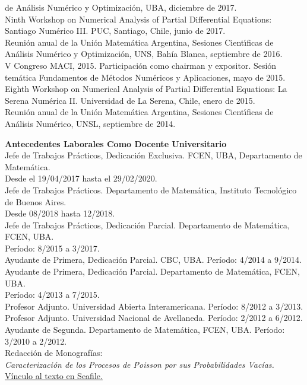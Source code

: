de An\'alisis Num\'erico y Optimizaci\'on, UBA, diciembre de 2017.\\[4pt]
Ninth Workshop on Numerical Analysis of Partial Differential Equations: Santiago Num\'erico III.
PUC, Santiago, Chile, junio de
2017.\\[4pt]
Reuni\'on anual de la Uni\'on Matem\'atica Argentina, Sesiones Cient\'{\i}ficas
de An\'alisis Num\'erico y Optimizaci\'on, UNS, Bah\'ia Blanca, septiembre de 2016.\\[4pt]
V Congreso MACI, 2015. Participaci\'on como 
chairman y expositor. Sesi\'on tem\'atica Fundamentos de M\'etodos 
Num\'ericos y Aplicaciones, mayo
de 2015.\\[4pt]
Eighth Workshop on Numerical Analysis of Partial Differential Equations: La Serena Num\'erica II.
Universidad de La Serena, Chile, enero de 
2015.\\[4pt]
Reuni\'on anual de la Uni\'on Matem\'atica Argentina, Sesiones Cient\'{\i}ficas
de An\'alisis Num\'erico, UNSL, septiembre de 2014.

\textbf{Antecedentes Laborales Como Docente Universitario}\\[6pt]
Jefe de Trabajos Pr\'acticos, Dedicaci\'on Exclusiva. FCEN, UBA, 
Departamento de Matem\'atica.\\Desde el 19/04/2017 hasta el 29/02/2020.\\[4pt]
Jefe de Trabajos Pr\'acticos. Departamento de Matem\'atica, 
Instituto Tecnol\'ogico de Buenos Aires.\\Desde 08/2018 hasta 12/2018.\\[4pt]
Jefe de Trabajos Pr\'acticos, Dedicaci\'on Parcial. Departamento de Matem\'atica, FCEN, UBA.\\
Per\'iodo: 8/2015 a 3/2017.\\[4pt]
Ayudante de Primera, Dedicaci\'on Parcial. CBC, UBA. Per\'iodo: 4/2014 a 9/2014.\\[4pt]
Ayudante de Primera, Dedicaci\'on Parcial. Departamento de Matem\'atica, FCEN, UBA.\\
Per\'iodo: 4/2013 a 7/2015.\\[4pt]
Profesor Adjunto. Universidad Abierta Interamericana.
Per\'iodo: 8/2012 a 3/2013.\\[4pt]
Profesor Adjunto. Universidad Nacional de Avellaneda.
Per\'iodo: 2/2012 a 6/2012.\\[4pt]
Ayudante de Segunda. Departamento de Matem\'atica, FCEN, UBA. Per\'iodo: 3/2010 a 2/2012.\\[6pt]
Redacci\'on de Monograf\'ias:\\[6pt]
\emph{Caracterizaci\'on de los Procesos de Poisson por sus Probabilidades Vac\'ias.} 
\href{https://nube.dm.uba.ar/f/c4aa2335cb/}{\color{blue}V\'inculo al texto en Seafile.}

